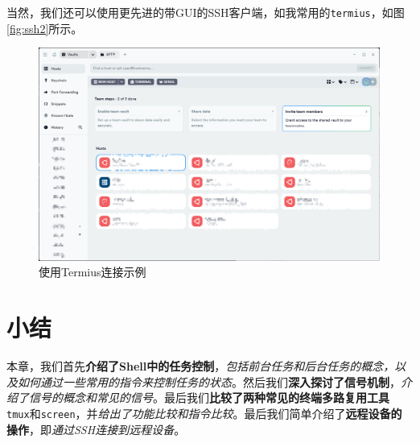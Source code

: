 当然，我们还可以使用更先进的带GUI的SSH客户端，如我常用的\texttt{termius}，如图\autoref{fig:ssh2}所示。

\begin{figure}[!h]
    \centering
    \includegraphics[width=.8\textwidth]{./Figures/ssh2.png}
    \caption{使用Termius连接示例}
    \label{fig:ssh2}
\end{figure}

\section{小结}

本章，我们首先\textbf{介绍了Shell中的任务控制}，\textit{包括前台任务和后台任务的概念，以及如何通过一些常用的指令来控制任务的状态}。然后我们\textbf{深入探讨了信号机制}，\textit{介绍了信号的概念和常见的信号}。最后我们\textbf{比较了两种常见的终端多路复用工具}\texttt{tmux}和\texttt{screen}，并\textit{给出了功能比较和指令比较}。最后我们简单介绍了\textbf{远程设备的操作}，即\textit{通过SSH连接到远程设备}。